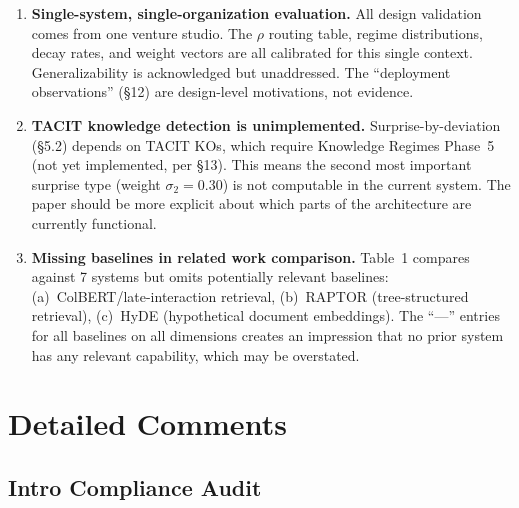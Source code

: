 \documentclass[11pt,a4paper]{article}
\begin{document}
\begin{enumerate}[label=\textbf{W\arabic*.}, leftmargin=2cm]
\item \textbf{Single-system, single-organization evaluation.} All design validation comes from one venture studio. The $\rho$ routing table, regime distributions, decay rates, and weight vectors are all calibrated for this single context. Generalizability is acknowledged but unaddressed. The ``deployment observations'' (\S12) are design-level motivations, not evidence.

\item \textbf{TACIT knowledge detection is unimplemented.} Surprise-by-deviation (\S5.2) depends on TACIT KOs, which require Knowledge Regimes Phase~5 (not yet implemented, per \S13). This means the second most important surprise type (weight $\sigma_2 = 0.30$) is not computable in the current system. The paper should be more explicit about which parts of the architecture are currently functional.

\item \textbf{Missing baselines in related work comparison.} Table~1 compares against 7 systems but omits potentially relevant baselines: (a)~ColBERT/late-interaction retrieval, (b)~RAPTOR (tree-structured retrieval), (c)~HyDE (hypothetical document embeddings). The ``---'' entries for all baselines on all dimensions creates an impression that no prior system has any relevant capability, which may be overstated.

\end{enumerate}

\section{Detailed Comments}

\subsection{Intro Compliance Audit}
\end{document}
